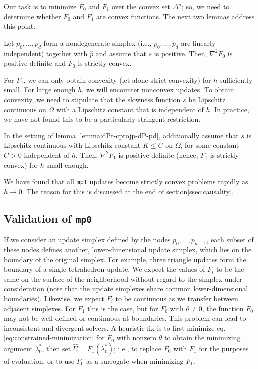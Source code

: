 \documentclass[smallcondensed]{svjour3}
\begin{document}
Our task is to minimize $F_0$ and $F_1$ over the convex set
$\Delta^n$; so, we need to determine whether $F_0$ and $F_1$ are
convex functions. The next two lemmas address this point.

\begin{lemma}\label{lemma:dPt-cprojp-dP-pd}
  Let $p_0, \hdots, p_d$ form a nondegenerate simplex (i.e.,
  $p_0, \hdots, p_d$ are linearly independent) together with $\hat{p}$
  and assume that $s$ is positive. Then, $\nabla^2 F_0$ is positive
  definite and $F_0$ is strictly convex.
\end{lemma}

For $F_1$, we can only obtain convexity (let alone strict convexity)
for $h$ sufficiently small. For large enough $h$, we will encounter
nonconvex updates. To obtain convexity, we need to stipulate that the
slowness function $s$ be Lipschitz continuous on $\Omega$ with a
Lipschitz constant that is independent of $h$. In practice, we have
not found this to be a particularly stringent restriction.

\begin{lemma}\label{lemma:F-strictly-convex}
  In the setting of lemma \ref{lemma:dPt-cprojp-dP-pd}, additionally
  assume that $s$ is Lipschitz continuous with Lipschitz constant
  $K \leq C$ on $\Omega$, for some constant $C > 0$ independent of
  $h$. Then, $\nabla^2 F_1$ is positive definite (hence, $F_1$ is
  strictly convex) for $h$ small enough.
\end{lemma}

We have found that all \texttt{mp1} updates become strictly convex
problems rapidly as $h \to 0$. The reason for this is discussed at the
end of section\@ \ref{ssec:causality}.

\subsection{Validation of \texttt{mp0}}\label{ssec:validation}

If we consider an update simplex defined by the nodes
$p_0, \hdots, p_{n-1}$, each subset of these nodes defines another,
lower-dimensional update simplex, which lies on the boundary of the
original simplex. For example, three triangle updates form the
boundary of a single tetrahedron update. We expect the values of $F_i$
to be the same on the surface of the neighborhood without regard to
the simplex under consideration (note that the update simplexes share
common lower-dimensional boundaries). Likewise, we expect $F_i$ to be
continuous as we transfer between adjacent simplexes. For $F_1$ this
is the case, but for $F_0$ with $\theta \neq 0$, the function $F_0$
may not be well-defined or continuous at boundaries. This problem can
lead to inconsistent and divergent solvers. A heuristic fix is to
first minimize eq.\@ \ref{eq:constrained-minimization} for $F_0$
with nonzero $\theta$ to obtain the minimizing argument $\lambda^*_0$,
then set $\hat{U} = F_1(\lambda_0^*)$; i.e., to replace $F_0$ with
$F_1$ for the purposes of evaluation, or to use $F_0$ as a surrogate
when minimizing $F_1$.
\end{document}
